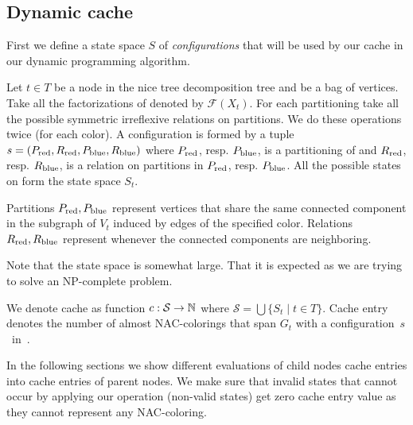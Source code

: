 \subsection{Dynamic cache}

First we define a state space \( S \) of \emph{configurations}
that will be used by our cache in our dynamic programming algorithm.

%
\begin{definition}
	Let \( t \in T \) be a node in the nice tree decomposition tree and
	\Xt{} be a bag of vertices.
	Take all the factorizations of \Xt{} denoted by \( \mathcal{F}(X_t) \).
	For each partitioning take all the possible
	symmetric irreflexive relations on partitions.
	We do these operations twice (for each color).
	A configuration is formed by a tuple \( s = (P_{\text{red}}, R_{\text{red}}, P_{\text{blue}}, R_{\text{blue}}) \)
	where \( P_{\text{red}}\), resp. \( P_{\text{blue}} \), is a partitioning of \Xt{}
	and \( R_{\text{red}}\), resp. \(R_{\text{blue}} \), is a relation
	on partitions in \( P_{\text{red}}\), resp. \(P_{\text{blue}} \).
	All the possible states on \Xt{} form the state space \( S_t \).
\end{definition}
%
Partitions \( P_{\text{red}}, P_{\text{blue}} \) represent vertices
that share the same connected component in the subgraph of \( V_t \)
induced by edges of the specified color.
Relations \( R_{\text{red}}, R_{\text{blue}} \) represent
whenever the connected components are neighboring.

Note that the state space is somewhat large.
That it is expected as we are trying to solve an NP-complete problem.

We denote cache as function \( c: \mathcal{S} \to \mathbb{N} \)
where \( \mathcal{S} = \bigcup\{S_t \mid t \in T\} \).
Cache entry denotes the number of almost NAC-colorings
that span \( G_t \) with a configuration~\( s \)~in~\Xt{}.

In the following sections we show different evaluations
of child nodes cache entries into cache entries of parent nodes.
We make sure that invalid states that cannot occur by applying our operation (non-valid states)
get zero cache entry value as they cannot represent any NAC-coloring.

\subsection{\IntroduceVertexNode}

